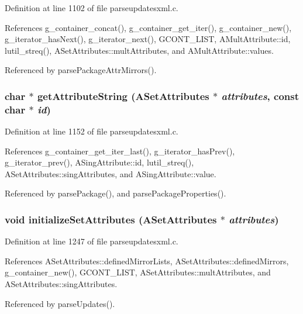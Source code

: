 Definition at line 1102 of file parseupdatesxml.c.

References g\_\-container\_\-concat(), g\_\-container\_\-get\_\-iter(), g\_\-container\_\-new(), g\_\-iterator\_\-has\-Next(), g\_\-iterator\_\-next(), GCONT\_\-LIST, AMult\-Attribute::id, lutil\_\-streq(), ASet\-Attributes::mult\-Attributes, and AMult\-Attribute::values.

Referenced by parse\-Package\-Attr\-Mirrors().
\subsubsection{\setlength{\rightskip}{0pt plus 5cm}char $\ast$ get\-Attribute\-String ({\bf ASet\-Attributes} $\ast$ {\em attributes}, const char $\ast$ {\em id})\hspace{0.3cm}{\tt  [static]}}\label{parseupdatesxml_8c_a24}




Definition at line 1152 of file parseupdatesxml.c.

References g\_\-container\_\-get\_\-iter\_\-last(), g\_\-iterator\_\-has\-Prev(), g\_\-iterator\_\-prev(), ASing\-Attribute::id, lutil\_\-streq(), ASet\-Attributes::sing\-Attributes, and ASing\-Attribute::value.

Referenced by parse\-Package(), and parse\-Package\-Properties().
\subsubsection{\setlength{\rightskip}{0pt plus 5cm}void initialize\-Set\-Attributes ({\bf ASet\-Attributes} $\ast$ {\em attributes})\hspace{0.3cm}{\tt  [static]}}\label{parseupdatesxml_8c_a26}




Definition at line 1247 of file parseupdatesxml.c.

References ASet\-Attributes::defined\-Mirror\-Lists, ASet\-Attributes::defined\-Mirrors, g\_\-container\_\-new(), GCONT\_\-LIST, ASet\-Attributes::mult\-Attributes, and ASet\-Attributes::sing\-Attributes.

Referenced by parse\-Updates().
